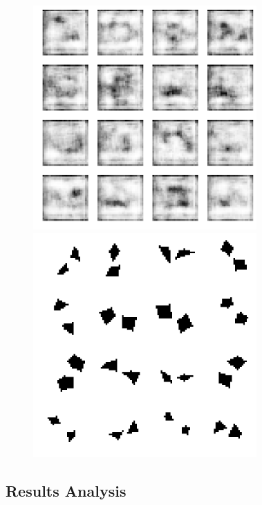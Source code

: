 \documentclass{article}
\begin{document}
\clearpage
\thispagestyle{empty}
\begin{figure}[ht]
\label{fig:gan-samples-matching}
\centering
\includegraphics[height=323px]{gan-sample-fake-matching.png}
\caption{}
\vspace{1em}
\includegraphics[height=323px]{gan-sample-real-matching.png}
\end{figure}

\restoregeometry
\pagestyle{plain}

\newpage

\subsection{Results Analysis}
\end{document}
